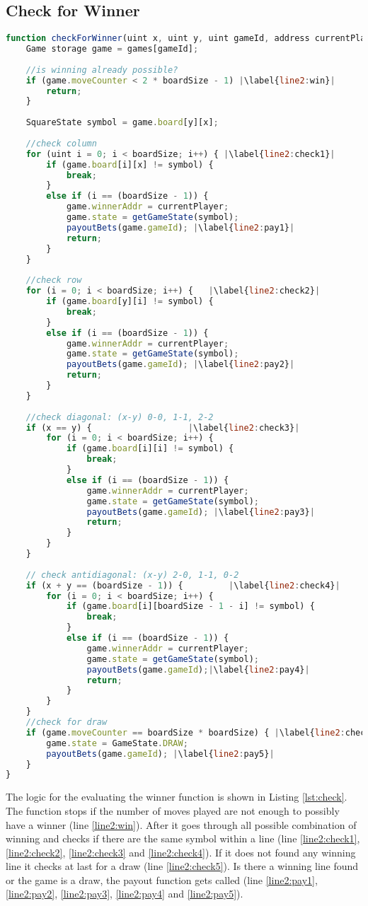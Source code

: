 \subsection{Check for Winner}\label{subsec:check}
\begin{lstlisting}[caption={Check for Winner Function on the Smart Contract}, label={lst:check},language=JavaScript,escapechar=|]
function checkForWinner(uint x, uint y, uint gameId, address currentPlayer) private {
	Game storage game = games[gameId];
	
	//is winning already possible?
	if (game.moveCounter < 2 * boardSize - 1) |\label{line2:win}|
		return;
	}
	
	SquareState symbol = game.board[y][x];
	
	//check column
	for (uint i = 0; i < boardSize; i++) { |\label{line2:check1}|
		if (game.board[i][x] != symbol) {
			break;
		}
		else if (i == (boardSize - 1)) {
			game.winnerAddr = currentPlayer;
			game.state = getGameState(symbol);
			payoutBets(game.gameId); |\label{line2:pay1}|
			return;
		}
	}
	
	//check row
	for (i = 0; i < boardSize; i++) {	|\label{line2:check2}|
		if (game.board[y][i] != symbol) {
			break;
		}
		else if (i == (boardSize - 1)) {
			game.winnerAddr = currentPlayer;
			game.state = getGameState(symbol);
			payoutBets(game.gameId); |\label{line2:pay2}|
			return;
		}
	}
	
	//check diagonal: (x-y) 0-0, 1-1, 2-2 
	if (x == y) {					|\label{line2:check3}|
		for (i = 0; i < boardSize; i++) {
			if (game.board[i][i] != symbol) {
				break;
			}
			else if (i == (boardSize - 1)) {
				game.winnerAddr = currentPlayer;
				game.state = getGameState(symbol);
				payoutBets(game.gameId); |\label{line2:pay3}|
				return;
			}
		}
	}
	
	// check antidiagonal: (x-y) 2-0, 1-1, 0-2
	if (x + y == (boardSize - 1)) {			|\label{line2:check4}|
		for (i = 0; i < boardSize; i++) {
			if (game.board[i][boardSize - 1 - i] != symbol) {
				break;
			}
			else if (i == (boardSize - 1)) {
				game.winnerAddr = currentPlayer;
				game.state = getGameState(symbol);
				payoutBets(game.gameId);|\label{line2:pay4}|
				return;
			}
		}
	}
	//check for draw
	if (game.moveCounter == boardSize * boardSize) { |\label{line2:check5}|
		game.state = GameState.DRAW;
		payoutBets(game.gameId); |\label{line2:pay5}|
	}
}
\end{lstlisting}

The logic for the evaluating the winner function is shown in Listing \ref{lst:check}. The function stops if the number of moves played are not enough to possibly have a winner (line \ref{line2:win}). After it goes through all possible combination of winning and checks if there are the same symbol within a line (line \ref{line2:check1}, \ref{line2:check2}, \ref{line2:check3} and \ref{line2:check4}). If it does not found any winning line it checks at last for a draw (line \ref{line2:check5}). Is there a winning line found or the game is a draw, the payout function gets called (line \ref{line2:pay1}, \ref{line2:pay2}, \ref{line2:pay3}, \ref{line2:pay4} and \ref{line2:pay5}).